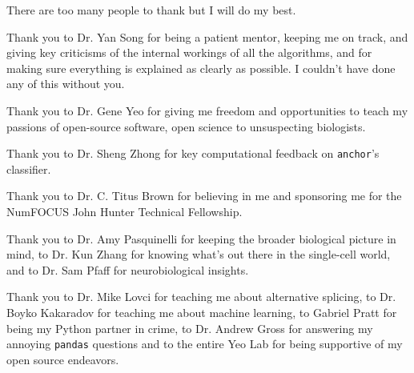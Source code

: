 \begin{frontmatter}
{
\let\oldnumberline\numberline
\renewcommand*{\numberline}[1]{%
  \oldnumberline{\figurename~#1:}}%
\listoffigures  %
}


%
%
\begin{acknowledgements}

There are too many people to thank but I will do my best. 

Thank you to Dr. Yan Song for being a patient mentor, keeping me on track, and giving key criticisms of the internal workings of all the algorithms, and for making sure everything is explained as clearly as possible. I couldn't have done any of this without you.

Thank you to Dr. Gene Yeo for giving me freedom and opportunities to teach my passions of open-source software, open science to unsuspecting biologists.

Thank you to Dr. Sheng Zhong for key computational feedback on \texttt{anchor}'s classifier.

Thank you to Dr. C. Titus Brown for believing in me and sponsoring me for the NumFOCUS John Hunter Technical Fellowship.

Thank you to Dr. Amy Pasquinelli for keeping the broader biological picture in mind, to Dr. Kun Zhang for knowing what's out there in the single-cell world, and to Dr. Sam Pfaff for neurobiological insights.

Thank you to Dr. Mike Lovci for teaching me about alternative splicing, to Dr. Boyko Kakaradov for teaching me about machine learning, to Gabriel Pratt for being my Python partner in crime, to Dr. Andrew Gross for answering my annoying \texttt{pandas} questions and to the entire Yeo Lab for being supportive of my open source endeavors.



\end{acknowledgements}
\end{frontmatter}
